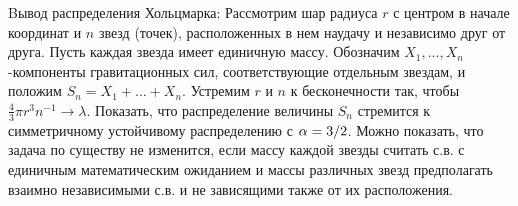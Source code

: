 \begin{problem}
Bывод распределения Хольцмарка: Рассмотрим шар радиуса $r$ с центром в начале координат и $n$ звезд (точек), расположенных в нем наудачу и независимо друг от друга. Пусть каждая звезда имеет единичную массу. Обозначим $X_{1} ,...,X_{n} $ -компоненты гравитационных сил, соответствующие отдельным звездам, и положим $S_{n} =X_{1} +...+X_{n} $. Устремим $r$ и $n$ к бесконечности так, чтобы $\frac{4}{3} \pi r^{3} n^{-1} \to \lambda $. Показать, что распределение величины $S_{n} $ стремится к симметричному устойчивому распределению с $\alpha ={3\mathord{\left/ {\vphantom {3 2}} \right. \kern-\nulldelimiterspace} 2} $. Можно показать, что задача по существу не изменится, если массу каждой звезды считать с.в. с единичным математическим ожиданием и массы различных звезд предполагать взаимно независимыми с.в. и не зависящими также от их расположения.
\end{problem}


